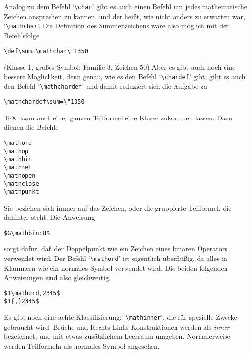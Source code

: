 Analog zu dem Befehl `\verb|\char|' gibt es auch einen Befehl um jedes
mathematische Zeichen ansprechen zu k\"onnen, und der hei\ss{}t, wie nicht
anders zu erwarten war, 
`\verb|\mathchar|'. Die 
Definition des
Summenzeichens w\"are also m\"oglich mit der Befehlsfolge
\begin{verbatim}
\def\sum=\mathchar\"1350
\end{verbatim}
(Klasse 1, gro\ss{}es Symbol; Familie 3, Zeichen 50) Aber es gibt auch
noch eine bessere M\"oglichkeit, denn genau, wie es den Befehl
`\verb|\chardef|' gibt, gibt es auch den Befehl
`\verb|\mathchardef|'
und damit reduziert sich die Aufgabe zu
\begin{verbatim}
\mathchardef\sum=\"1350
\end{verbatim}

\TeX\ kann auch einer ganzen Teilformel eine Klasse zukommen lassen.
Dazu dienen die Befehle
\begin{verbatim}
\mathord
\mathop
\mathbin
\mathrel
\mathopen
\mathclose
\mathpunkt
\end{verbatim}
Sie beziehen sich immer auf das Zeichen, oder die gruppierte
Teilformel, die dahinter steht. Die Anweisung
\begin{verbatim}
$G\mathbin:H$
\end{verbatim}
sorgt daf\"ur, da\ss{} der 
Doppelpunkt wie ein Zeichen eines bin\"aren
Operators verwendet wird. Der Befehl `\verb|\mathord|' ist eigentlich
\"uberfl\"u\ss{}ig, da alles in Klammern wie ein normales Symbol verwendet
wird. Die beiden folgenden Anweisungen sind also gleichwertig
\begin{verbatim}
$1\mathord,2345$
$1{,}2345$
\end{verbatim}
Es gibt noch eine achte Klassifizierung: 
`\verb|\mathinner|', die f\"ur
spezielle Zwecke gebraucht wird. Br\"uche und
Rechts-Links-Konstruktionen werden als {\em inner} bezeichnet, und mit
etwas zus\"atzlichem 
Leerraum umgeben. Normalerweise werden Teilformeln
als normales Symbol angesehen.
